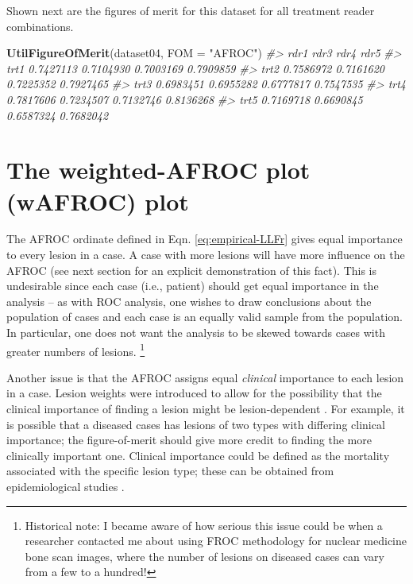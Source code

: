 \documentclass[
]{book}
\newenvironment{Shaded}{\begin{snugshade}}{\end{snugshade}}
\newcommand{\CommentTok}[1]{\textcolor[rgb]{0.56,0.35,0.01}{\textit{#1}}}
\newcommand{\DataTypeTok}[1]{\textcolor[rgb]{0.13,0.29,0.53}{#1}}
\newcommand{\KeywordTok}[1]{\textcolor[rgb]{0.13,0.29,0.53}{\textbf{#1}}}
\newcommand{\NormalTok}[1]{#1}
\newcommand{\StringTok}[1]{\textcolor[rgb]{0.31,0.60,0.02}{#1}}
\begin{document}
Shown next are the figures of merit for this dataset for all treatment reader combinations.

\begin{Shaded}
\begin{Highlighting}[]
\KeywordTok{UtilFigureOfMerit}\NormalTok{(dataset04, }\DataTypeTok{FOM =} \StringTok{"AFROC"}\NormalTok{)}
\CommentTok{#>           rdr1      rdr3      rdr4      rdr5}
\CommentTok{#> trt1 0.7427113 0.7104930 0.7003169 0.7909859}
\CommentTok{#> trt2 0.7586972 0.7161620 0.7225352 0.7927465}
\CommentTok{#> trt3 0.6983451 0.6955282 0.6777817 0.7547535}
\CommentTok{#> trt4 0.7817606 0.7234507 0.7132746 0.8136268}
\CommentTok{#> trt5 0.7169718 0.6690845 0.6587324 0.7682042}
\end{Highlighting}
\end{Shaded}

\hypertarget{empirical-wAFROC}{%
\section{The weighted-AFROC plot (wAFROC) plot}\label{empirical-wAFROC}}

The AFROC ordinate defined in Eqn. \eqref{eq:empirical-LLFr} gives equal importance to every lesion in a case. A case with more lesions will have more influence on the AFROC (see next section for an explicit demonstration of this fact). This is undesirable since each case (i.e., patient) should get equal importance in the analysis -- as with ROC analysis, one wishes to draw conclusions about the population of cases and each case is an equally valid sample from the population. In particular, one does not want the analysis to be skewed towards cases with greater numbers of lesions. \footnote{Historical note: I became aware of how serious this issue could be when a researcher contacted me about using FROC methodology for nuclear medicine bone scan images, where the number of lesions on diseased cases can vary from a few to a hundred!}

Another issue is that the AFROC assigns equal \emph{clinical} importance to each lesion in a case. Lesion weights were introduced \citep{RN1385} to allow for the possibility that the clinical importance of finding a lesion might be lesion-dependent \citep{RN1966}. For example, it is possible that a diseased cases has lesions of two types with differing clinical importance; the figure-of-merit should give more credit to finding the more clinically important one. Clinical importance could be defined as the mortality associated with the specific lesion type; these can be obtained from epidemiological studies \citep{desantis2011breast}.
\end{document}
